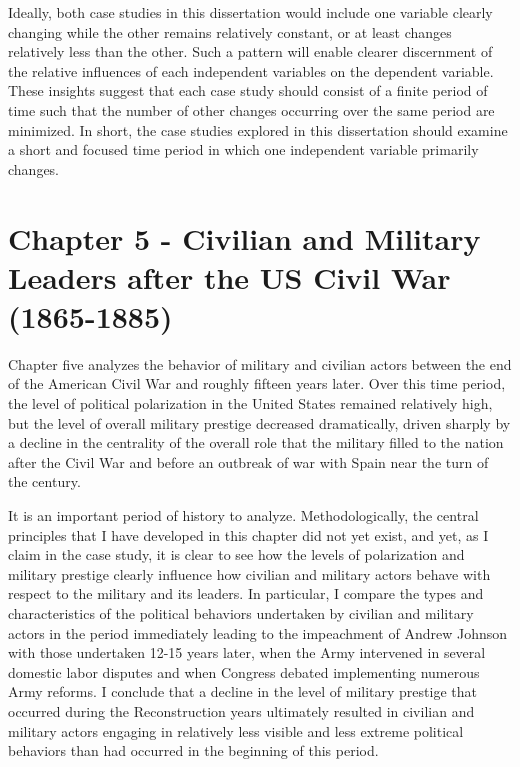 \documentclass[
  12pt,
  oneside]{memoir}
\begin{document}
Ideally, both case studies in this dissertation would include one variable clearly changing while the other remains relatively constant, or at least changes relatively less than the other. Such a pattern will enable clearer discernment of the relative influences of each independent variables on the dependent variable. These insights suggest that each case study should consist of a finite period of time such that the number of other changes occurring over the same period are minimized. In short, the case studies explored in this dissertation should examine a short and focused time period in which one independent variable primarily changes.

\hypertarget{chapter-5---civilian-and-military-leaders-after-the-us-civil-war-1865-1885}{%
\section{Chapter 5 - Civilian and Military Leaders after the US Civil War (1865-1885)}\label{chapter-5---civilian-and-military-leaders-after-the-us-civil-war-1865-1885}}

Chapter five analyzes the behavior of military and civilian actors between the end of the American Civil War and roughly fifteen years later. Over this time period, the level of political polarization in the United States remained relatively high, but the level of overall military prestige decreased dramatically, driven sharply by a decline in the centrality of the overall role that the military filled to the nation after the Civil War and before an outbreak of war with Spain near the turn of the century.

It is an important period of history to analyze. Methodologically, the central principles that I have developed in this chapter did not yet exist, and yet, as I claim in the case study, it is clear to see how the levels of polarization and military prestige clearly influence how civilian and military actors behave with respect to the military and its leaders. In particular, I compare the types and characteristics of the political behaviors undertaken by civilian and military actors in the period immediately leading to the impeachment of Andrew Johnson with those undertaken 12-15 years later, when the Army intervened in several domestic labor disputes and when Congress debated implementing numerous Army reforms. I conclude that a decline in the level of military prestige that occurred during the Reconstruction years ultimately resulted in civilian and military actors engaging in relatively less visible and less extreme political behaviors than had occurred in the beginning of this period.
\end{document}
